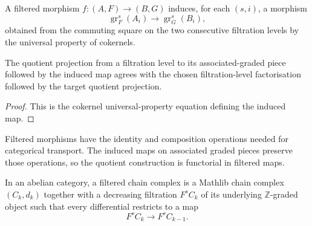 \begin{definition}
  \leanok
  \label{def:core-associated-graded-map}
  A filtered morphism $f:(A,F)\to(B,G)$ induces, for each $(s,i)$, a morphism
  \[
    \operatorname{gr}^s_F(A_i)\longrightarrow
    \operatorname{gr}^s_G(B_i),
  \]
  obtained from the commuting square on the two consecutive filtration levels
  by the universal property of cokernels.
\end{definition}

\begin{lemma}
  \leanok
  \label{lem:core-associated-graded-map-projection}
  The quotient projection from a filtration level to its associated-graded
  piece followed by the induced map agrees with the chosen filtration-level
  factorisation followed by the target quotient projection.
\end{lemma}

\begin{proof}
  \leanok
  This is the cokernel universal-property equation defining the induced map.
\end{proof}

\begin{definition}
  \leanok
  \label{def:core-filtered-morphism-functoriality}
  Filtered morphisms have the identity and composition operations needed for
  categorical transport.  The induced maps on associated graded pieces
  preserve those operations, so the quotient construction is functorial in
  filtered maps.
\end{definition}

\begin{definition}
  \leanok
  \label{def:core-filtered-chain-complex}
  In an abelian category, a filtered chain complex is a Mathlib chain complex
  $(C_k,d_k)$ together with a decreasing filtration $F^sC_k$ of its underlying
  $\mathbb Z$-graded object such that every differential restricts to a map
  \[
    F^sC_k\longrightarrow F^sC_{k-1}.
  \]
\end{definition}

